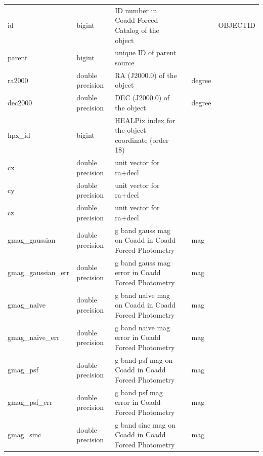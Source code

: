\documentclass[12pt]{article}
\begin{document}
\begin{table}[thbp]
\begin{center}
{\begin{tabular}{llllll}
id & bigint & ID number in Coadd Forced Catalog of the object     &                            &             & OBJECTID  \\
parent & bigint & unique ID of parent source                          &                            &             &   \\
ra2000 & double precision & RA (J2000.0) of the object                          &                            & degree      &   \\
dec2000 & double precision & DEC (J2000.0) of the object                         &                            & degree      &   \\
hpx\_id & bigint & HEALPix index for the object coordinate (order 18)   &                            &             &   \\
cx & double precision & unit vector for ra+decl                            &                            &             &   \\
cy & double precision & unit vector for ra+decl                            &                            &             &   \\
cz & double precision & unit vector for ra+decl                            &                            &             &   \\
gmag\_gaussian & double precision & g band gauss mag on Coadd in Coadd Forced Photometry      &                            & mag            &   \\
gmag\_gaussian\_err & double precision & g band gauss mag error in Coadd Forced Photometry     &                            & mag            &   \\
gmag\_naive & double precision & g band naive mag on Coadd in Coadd Forced Photometry         &                            & mag            &   \\
gmag\_naive\_err & double precision & g band naive mag error in Coadd Forced Photometry        &                            & mag            &   \\
gmag\_psf & double precision & g band psf mag on Coadd in Coadd Forced Photometry         &                            & mag            &  \\
gmag\_psf\_err & double precision & g band psf mag error in Coadd Forced Photometry        &                            & mag            &   \\
gmag\_sinc & double precision & g band sinc mag on Coadd in Coadd Forced Photometry         &                            & mag            &  \\

\end{tabular}}
\end{center}
\end{table}
\end{document}
